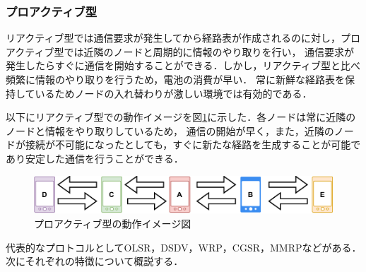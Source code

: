 \documentclass[a4paper, 11pt]{ltjsarticle}
\begin{document}
\clearpage
\subsubsection{プロアクティブ型}
リアクティブ型では通信要求が発生してから経路表が作成されるのに対し，プロアクティブ型では近隣のノードと周期的に情報のやり取りを行い，
通信要求が発生したらすぐに通信を開始することができる．しかし，リアクティブ型と比べ頻繁に情報のやり取りを行うため，電池の消費が早い．
常に新鮮な経路表を保持しているためノードの入れ替わりが激しい環境では有効的である．

以下にリアクティブ型での動作イメージを図\ref{proactive}に示した．各ノードは常に近隣のノードと情報をやり取りしているため，
通信の開始が早く，また，近隣のノードが接続が不可能になったとしても，すぐに新たな経路を生成することが可能であり安定した通信を行うことができる．
\begin{figure}[H]
  \centering
  \includegraphics[width=130mm]{proactive_model.pdf}
  \caption{プロアクティブ型の動作イメージ図}
  \label{proactive}
\end{figure}

代表的なプロトコルとしてOLSR，DSDV，WRP，CGSR，MMRPなどがある．
次にそれぞれの特徴について概説する．
\end{document}
